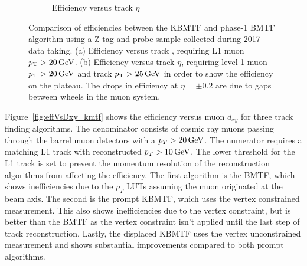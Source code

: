 \begin{figure}[htb!]
\begin{subfigure}[h]{0.45\linewidth}
		\caption{Efficiency versus track $\eta$}
		\label{fig:effVsEta}
	\end{subfigure}
	\caption[Comparison of efficiencies between the KBMTF and phase-1 BMTF algorithm using a Z tag-and-probe sample collected during 2017 data taking. (a) Efficiency versus track \pt, requiring L1 muon $\pt>20\GeV$. (b) Efficiency versus track $\eta$, requiring L1 muon $\pt>20\GeV$ and track $\pt>25\GeV$ in order to show the efficiency on the plateau. The drops in efficiency at $\eta=\pm0.2$ are due to gaps between wheels in the muon system.]{Comparison of efficiencies between the KBMTF and phase-1 BMTF algorithm using a Z tag-and-probe sample collected during 2017 data taking. (a) Efficiency versus track \pt, requiring L1 muon $\pt>20\GeV$. (b) Efficiency versus track $\eta$, requiring level-1 muon $\pt>20\GeV$ and track $\pt>25\GeV$ in order to show the efficiency on the plateau. The drops in efficiency at $\eta=\pm0.2$ are due to gaps between wheels in the muon system.}
	\label{fig:eff_KmtfVsBmtf}
\end{figure}

Figure~\ref{fig:effVsDxy_kmtf} shows the efficiency versus muon $d_{xy}$ for three track finding algorithms. The denominator consists of cosmic ray muons passing through the barrel muon detectors with a $p_T>20\,\text{Ge\hspace{-.08em}V}$. The numerator requires a matching L1 track with reconstructed $p_T>10\,\text{Ge\hspace{-.08em}V}$. The lower threshold for the L1 track is set to prevent the momentum resolution of the reconstruction algorithms from affecting the efficiency. The first algorithm is the BMTF, which shows inefficiencies due to the $p_T$ LUTs assuming the muon originated at the beam axis. The second is the prompt KBMTF, which uses the vertex constrained measurement. This also shows inefficiencies due to the vertex constraint, but is better than the BMTF as the vertex constraint isn't applied until the last step of track reconstruction. Lastly, the displaced KBMTF uses the vertex unconstrained measurement and shows substantial improvements compared to both prompt algorithms.

